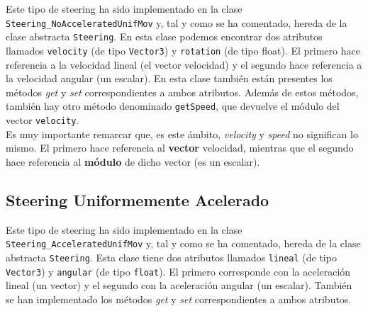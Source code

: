 Este tipo de steering ha sido implementado en la clase \texttt{Steering\_NoAcceleratedUnifMov} y, tal y como se ha comentado, hereda de la clase abstracta \texttt{Steering}. En esta clase podemos encontrar dos atributos llamados \texttt{velocity} (de tipo \texttt{Vector3}) y \texttt{rotation} (de tipo float). El primero hace referencia a la velocidad lineal (el vector velocidad) y el segundo hace referencia a la velocidad angular (un escalar). En esta clase también están presentes los métodos \textit{get} y \textit{set} correspondientes a ambos atributos. Además de estos métodos, también hay otro método denominado \texttt{getSpeed}, que devuelve el módulo del vector \texttt{velocity}. \\

Es muy importante remarcar que, es este ámbito, \textit{velocity} y \textit{speed} no significan lo mismo. El primero hace referencia al \textbf{vector} velocidad, mientras que el segundo hace referencia al \textbf{módulo} de dicho vector (es un escalar).

\subsection{Steering Uniformemente Acelerado}

Este tipo de steering ha sido implementado en la clase \texttt{Steering\_AcceleratedUnifMov} y, tal y como se ha comentado, hereda de la clase abstracta \texttt{Steering}. Esta clase tiene dos atributos llamados \texttt{lineal} (de tipo \texttt{Vector3}) y \texttt{angular} (de tipo \texttt{float}). El primero corresponde con la aceleración lineal (un vector) y el segundo con la aceleración angular (un escalar). También se han implementado los métodos \textit{get} y \textit{set} correspondientes a ambos atributos.

